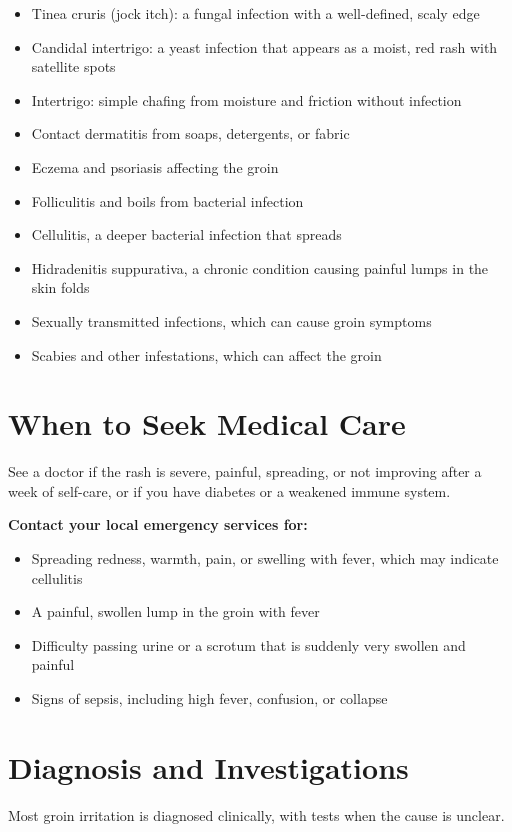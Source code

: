\begin{itemize}
    \item Tinea cruris (jock itch): a fungal infection with a well-defined, scaly edge
    \item Candidal intertrigo: a yeast infection that appears as a moist, red rash with satellite spots
    \item Intertrigo: simple chafing from moisture and friction without infection
    \item Contact dermatitis from soaps, detergents, or fabric
    \item Eczema and psoriasis affecting the groin
    \item Folliculitis and boils from bacterial infection
    \item Cellulitis, a deeper bacterial infection that spreads
    \item Hidradenitis suppurativa, a chronic condition causing painful lumps in the skin folds
    \item Sexually transmitted infections, which can cause groin symptoms
    \item Scabies and other infestations, which can affect the groin
\end{itemize}

\section*{When to Seek Medical Care}
See a doctor if the rash is severe, painful, spreading, or not improving after a week of self-care, or if you have diabetes or a weakened immune system.

\textbf{Contact your local emergency services for:}
\begin{itemize}
    \item Spreading redness, warmth, pain, or swelling with fever, which may indicate cellulitis
    \item A painful, swollen lump in the groin with fever
    \item Difficulty passing urine or a scrotum that is suddenly very swollen and painful
    \item Signs of sepsis, including high fever, confusion, or collapse
\end{itemize}

\section*{Diagnosis and Investigations}
Most groin irritation is diagnosed clinically, with tests when the cause is unclear.

